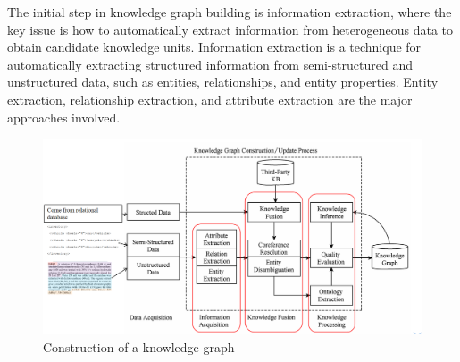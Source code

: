 \documentclass[%
 aip,
 jmp,%
 amsmath,amssymb,
 reprint,%
]{revtex4-2}
\begin{document}
The initial step in knowledge graph building is information extraction\cite{muhammad2020open}, where the key issue is how to automatically extract information from heterogeneous data to obtain candidate knowledge units. Information extraction is a technique for automatically extracting structured information from semi-structured and unstructured data, such as entities, relationships, and entity properties. Entity extraction, relationship extraction, and attribute extraction\cite{lee2013attribute} are the major approaches involved\cite{zheng2017joint}.

\begin{figure}[htbp]
    \centering
    \includegraphics[width=1\textwidth]{figure/8.png}
    \caption{ Construction of a knowledge graph }
    \label{ Fig.8 }
\end{figure}
\end{document}
